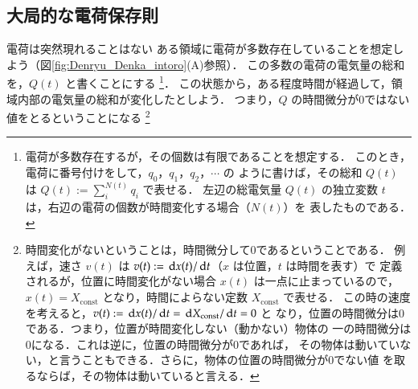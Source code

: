     \subsection{大局的な電荷保存則}
        \begin{mysmallsec}{電荷は突然現れることはない}
        ある領域に電荷が多数存在していることを想定しよう（図\ref{fig:Denryu_Denka_intoro}(A)参照）．
        この多数の電荷の電気量の総和を，$Q(t)$ と書くことにする
            \footnote{
                電荷が多数存在するが，その個数は有限であることを想定する．
                このとき，電荷に番号付けをして，$q_{0}$，$q_{1}$，$q_{2}$，$\cdots$ の
                ように書けば，その総和 $Q(t)$ は $Q(t):=\sum_{i}^{N(t)}q_{i}$ で表せる．
                左辺の総電気量 $Q(t)$ の独立変数 $t$ は，右辺の電荷の個数が時間変化する場合（$N(t)$）を
                表したものである．
            }．
        この状態から，ある程度時間が経過して，領域内部の電気量の総和が変化したとしよう．
        つまり，$Q$ の時間微分が0ではない値をとるということになる
            \footnote{
                時間変化がないということは，時間微分して0であるということである．
                例えば，速さ $v(t)$ は $v(t):=\,\mathrm{d} x(t)/\,\mathrm{d} t$（$x$ は位置，$t$ は時間を表す）で
                定義されるが，位置に時間変化がない場合 $x(t)$ は一点に止まっているので，
                $x(t)=X_{\mathrm{const}}$ となり，時間によらない定数 $X_{\mathrm{const}}$ で表せる．
                この時の速度を考えると，$v(t):=\,\mathrm{d} x(t)/\,\mathrm{d} t=\,\mathrm{d} X_{\mathrm{const}}/\,\mathrm{d} t = 0$ と
                なり，位置の時間微分は0である．つまり，位置が時間変化しない（動かない）物体の
                一の時間微分は0になる．これは逆に，位置の時間微分が0であれば，
                その物体は動いていない，と言うこともできる．さらに，物体の位置の時間微分が0でない値
                を取るならば，その物体は動いていると言える．

}
\end{mysmallsec}
